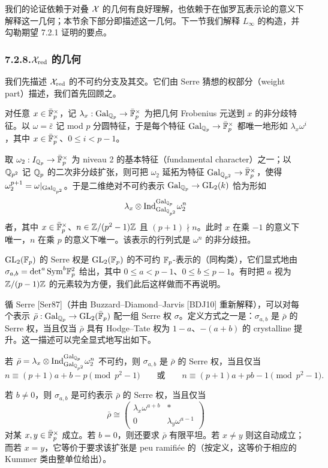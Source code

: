 我们的论证依赖于对叠 $\mathcal{X}$ 的几何有良好理解，也依赖于在伽罗瓦表示论的意义下解释这一几何；本节余下部分即描述这一几何。下一节我们解释 $L_\infty$ 的构造，并勾勒期望 7.2.1 证明的要点。

\subsubsection*{7.2.8.\quad $\mathcal{X}_{\mathrm{red}}$ 的几何}

我们先描述 $\mathcal{X}_{\mathrm{red}}$ 的不可约分支及其交。它们由 Serre 猜想的权部分（weight part）描述，我们首先回顾之。

对任意 $x\in\bar{\mathbb{F}}_p^\times$，记 $\lambda_x:\operatorname{Gal}_{\mathbb{Q}_p}\to\bar{\mathbb{F}}_p^\times$ 为把几何 Frobenius 元送到 $x$ 的非分歧特征。以 $\omega=\bar\varepsilon$ 记 mod $p$ 分圆特征，于是每个特征 $\operatorname{Gal}_{\mathbb{Q}_p}\to\bar{\mathbb{F}}_p^\times$ 都唯一地形如 $\lambda_x\omega^i$，其中 $x\in\bar{\mathbb{F}}_p^\times$、$0\le i<p-1$。

取 $\omega_2:I_{\mathbb{Q}_p}\to\bar{\mathbb{F}}_p^\times$ 为 niveau 2 的基本特征（fundamental character）之一；以 $\mathbb{Q}_{p^2}$ 记 $\mathbb{Q}_p$ 的二次非分歧扩张，则可把 $\omega_2$ 延拓为特征 $\operatorname{Gal}_{\mathbb{Q}_{p^2}}\to\bar{\mathbb{F}}_p^\times$，使得 $\omega_2^{p+1}=\omega|_{\operatorname{Gal}_{\mathbb{Q}_{p^2}}}$。于是二维绝对不可约表示 $\operatorname{Gal}_{\mathbb{Q}_p}\to\mathrm{GL}_2(k)$ 恰为形如
\[
\lambda_x\otimes\mathrm{Ind}_{\operatorname{Gal}_{\mathbb{Q}_{p^2}}}^{\operatorname{Gal}_{\mathbb{Q}_p}}\omega_2^n
\]
者，其中 $x\in\bar{\mathbb{F}}_p^\times$、$n\in\mathbb{Z}/(p^2-1)\mathbb{Z}$ 且 $(p+1)\nmid n$。此时 $x$ 在乘 $-1$ 的意义下唯一，$n$ 在乘 $p$ 的意义下唯一。该表示的行列式是 $\omega^n$ 的非分歧扭。

$\mathrm{GL}_2(\mathbb{F}_p)$ 的 Serre 权是 $\mathrm{GL}_2(\mathbb{F}_p)$ 的不可约 $\mathbb{F}_p$-表示的（同构类），它们显式地由 $\sigma_{a,b}=\det^a\mathrm{Sym}^b\mathbb{F}_p^2$ 给出，其中 $0\le a<p-1$、$0\le b\le p-1$。有时把 $a$ 视为 $\mathbb{Z}/(p-1)\mathbb{Z}$ 的元素较为方便，我们此后这样做而不再说明。

循 Serre [Ser87]（并由 Buzzard--Diamond--Jarvis [BDJ10] 重新解释），可以对每个表示 $\bar\rho:\operatorname{Gal}_{\mathbb{Q}_p}\to\mathrm{GL}_2(\bar{\mathbb{F}}_p)$ 配一组 Serre 权 $\sigma$。定义方式之一是：$\sigma_{a,b}$ 是 $\bar\rho$ 的 Serre 权，当且仅当 $\bar\rho$ 具有 Hodge--Tate 权为 $1-a$、$-(a+b)$ 的 crystalline 提升。这一描述可以完全显式地写出如下。

若 $\bar\rho=\lambda_x\otimes\mathrm{Ind}_{\operatorname{Gal}_{\mathbb{Q}_{p^2}}}^{\operatorname{Gal}_{\mathbb{Q}_p}}\omega_2^n$ 不可约，则 $\sigma_{a,b}$ 是 $\bar\rho$ 的 Serre 权，当且仅当
\[
n\equiv(p+1)a+b-p\pmod{p^2-1}
\qquad\text{或}\qquad
n\equiv(p+1)a+pb-1\pmod{p^2-1}.
\]

若 $b\ne0$，则 $\sigma_{a,b}$ 是可约表示 $\bar\rho$ 的 Serre 权，当且仅当
\begin{equation}\tag{7.2.9}\label{eq:a4-7-2-9}
\bar\rho\cong
\begin{pmatrix}
\lambda_x\omega^{a+b} & *\\
0 & \lambda_y\omega^{a-1}
\end{pmatrix}
\end{equation}
对某 $x,y\in\bar{\mathbb{F}}_p^\times$ 成立。若 $b=0$，则还要求 $\bar\rho$ 有限平坦。若 $x\ne y$ 则这自动成立；而若 $x=y$，它等价于要求该扩张是 peu ramifiée 的（按定义，这等价于相应的 Kummer 类由整单位给出）。

